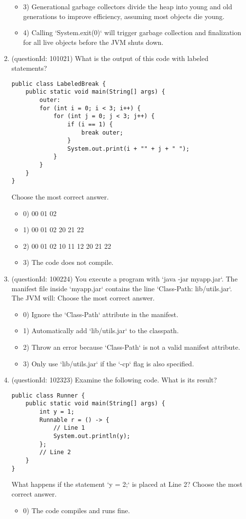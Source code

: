 \documentclass[12pt]{article}
\begin{document}
\begin{enumerate}[label=(\arabic*)]
\begin{itemize}
\item 3) Generational garbage collectors divide the heap into young and old generations to improve efficiency, assuming most objects die young.

\item 4) Calling `System.exit(0)` will trigger garbage collection and finalization for all live objects before the JVM shuts down.

\end{itemize}
\item (questionId: 101021) What is the output of this code with labeled statements?\n\begin{verbatim}
public class LabeledBreak {
    public static void main(String[] args) {
        outer:
        for (int i = 0; i < 3; i++) {
            for (int j = 0; j < 3; j++) {
                if (i == 1) {
                    break outer;
                }
                System.out.print(i + "" + j + " ");
            }
        }
    }
}
\end{verbatim}
Choose the most correct answer. 
\begin{itemize}
\item 0) 00 01 02 

\item 1) 00 01 02 20 21 22 

\item 2) 00 01 02 10 11 12 20 21 22 

\item 3) The code does not compile.

\end{itemize}
\item (questionId: 100224) You execute a program with `java -jar myapp.jar`. The manifest file inside `myapp.jar` contains the line `Class-Path: lib/utils.jar`. The JVM will:
Choose the most correct answer. 
\begin{itemize}
\item 0) Ignore the `Class-Path` attribute in the manifest.

\item 1) Automatically add `lib/utils.jar` to the classpath.

\item 2) Throw an error because `Class-Path` is not a valid manifest attribute.

\item 3) Only use `lib/utils.jar` if the `-cp` flag is also specified.

\end{itemize}
\item (questionId: 102323) Examine the following code. What is its result?\n\begin{verbatim}
public class Runner {
    public static void main(String[] args) {
        int y = 1;
        Runnable r = () -> {
            // Line 1
            System.out.println(y);
        };
        // Line 2
    }
}
\end{verbatim}
What happens if the statement `y = 2;` is placed at Line 2?
Choose the most correct answer. 
\begin{itemize}
\item 0) The code compiles and runs fine.


\end{itemize}
\end{enumerate}
\end{document}
